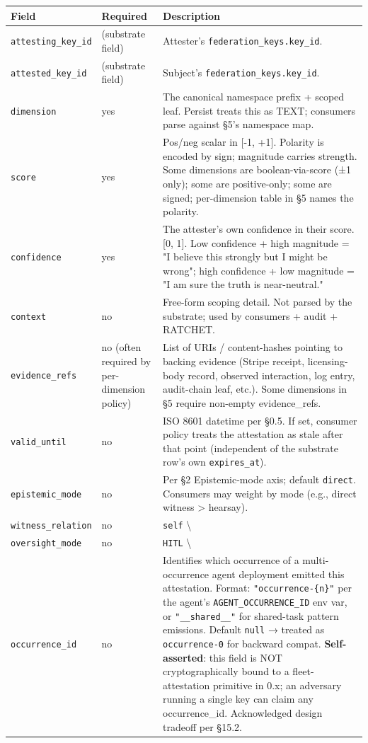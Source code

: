 \documentclass[10pt]{article}
\begin{document}
{\footnotesize
\begin{longtable}{|p{5.33cm}|p{5.33cm}|p{5.33cm}|}\hline
\textbf{Field} & \textbf{Required} & \textbf{Description} \\ \hline\endhead
\texttt{attesting\_key\_id} & (substrate field) & Attester's \texttt{federation\_keys.key\_id}. \\ \hline
\texttt{attested\_key\_id} & (substrate field) & Subject's \texttt{federation\_keys.key\_id}. \\ \hline
\texttt{dimension} & yes & The canonical namespace prefix + scoped leaf. Persist treats this as TEXT; consumers parse against §5's namespace map. \\ \hline
\texttt{score} & yes & Pos/neg scalar in [-1, +1]. Polarity is encoded by sign; magnitude carries strength. Some dimensions are boolean-via-score (±1 only); some are positive-only; some are signed; per-dimension table in §5 names the polarity. \\ \hline
\texttt{confidence} & yes & The attester's own confidence in their score. [0, 1]. Low confidence + high magnitude = "I believe this strongly but I might be wrong"; high confidence + low magnitude = "I am sure the truth is near-neutral." \\ \hline
\texttt{context} & no & Free-form scoping detail. Not parsed by the substrate; used by consumers + audit + RATCHET. \\ \hline
\texttt{evidence\_refs} & no (often required by per-dimension policy) & List of URIs / content-hashes pointing to backing evidence (Stripe receipt, licensing-body record, observed interaction, log entry, audit-chain leaf, etc.). Some dimensions in §5 require non-empty evidence\_refs. \\ \hline
\texttt{valid\_until} & no & ISO 8601 datetime per §0.5. If set, consumer policy treats the attestation as stale after that point (independent of the substrate row's own \texttt{expires\_at}). \\ \hline
\texttt{epistemic\_mode} & no & Per §2 Epistemic-mode axis; default \texttt{direct}. Consumers may weight by mode (e.g., direct witness > hearsay). \\ \hline
\texttt{witness\_relation} & no & \texttt{self} \textbackslash{} \\ \hline
\texttt{oversight\_mode} & no & \texttt{HITL} \textbackslash{} \\ \hline
\texttt{occurrence\_id} & no & Identifies which occurrence of a multi-occurrence agent deployment emitted this attestation. Format: \texttt{"occurrence-\{n\}"} per the agent's \texttt{AGENT\_OCCURRENCE\_ID} env var, or \texttt{"\_\_shared\_\_"} for shared-task pattern emissions. Default \texttt{null} → treated as \texttt{occurrence-0} for backward compat. \textbf{Self-asserted}: this field is NOT cryptographically bound to a fleet-attestation primitive in 0.x; an adversary running a single key can claim any occurrence\_id. Acknowledged design tradeoff per §15.2. \\ \hline

\end{longtable}}
\end{document}

